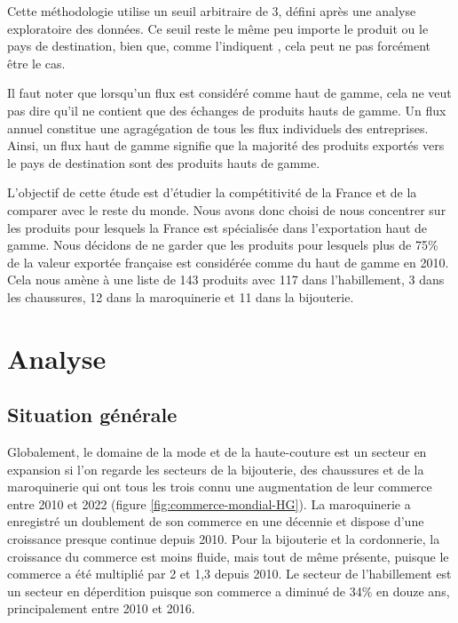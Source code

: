 \documentclass[french,10pt,a4paper]{article}
\begin{document}
Cette méthodologie utilise un seuil arbitraire de 3, défini après une analyse exploratoire des données. Ce seuil reste le même peu importe le produit ou le pays de destination, bien que, comme l'indiquent \cite{Martin2015}, cela peut ne pas forcément être le cas. 

Il faut noter que lorsqu'un flux est considéré comme haut de gamme, cela ne veut pas dire qu'il ne contient que des échanges de produits hauts de gamme. Un flux annuel constitue une agragégation de tous les flux individuels des entreprises. Ainsi, un flux haut de gamme signifie que la majorité des produits exportés vers le pays de destination sont des produits hauts de gamme.

\medskip

L'objectif de cette étude est d'étudier la compétitivité de la France et de la comparer avec le reste du monde. Nous avons donc choisi de nous concentrer sur les produits pour lesquels la France est spécialisée dans l'exportation haut de gamme. Nous décidons de ne garder que les produits pour lesquels plus de 75\% de la valeur exportée française est considérée comme du haut de gamme en 2010. Cela nous amène à une liste de 143 produits avec 117 dans l'habillement, 3 dans les chaussures, 12 dans la maroquinerie et 11 dans la bijouterie.


\section{Analyse}

\subsection{Situation générale}

Globalement, le domaine de la mode et de la haute-couture est un secteur en expansion si l'on regarde les secteurs de la bijouterie, des chaussures et de la maroquinerie qui ont tous les trois connu une augmentation de leur commerce entre 2010 et 2022 (figure \ref{fig:commerce-mondial-HG}). La maroquinerie a enregistré un doublement de son commerce en une décennie et dispose d'une croissance presque continue depuis 2010. Pour la bijouterie et la cordonnerie, la croissance du commerce est moins fluide, mais tout de même présente, puisque le commerce a été multiplié par 2 et 1,3 depuis 2010. Le secteur de l'habillement est un secteur en déperdition puisque son commerce a diminué de 34\% en douze ans, principalement entre 2010 et 2016. 
\end{document}
